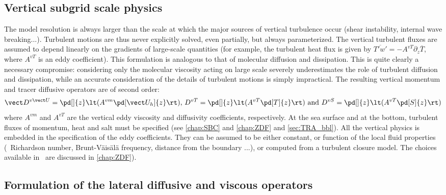 \documentclass[../main/NEMO_manual]{subfiles}
\begin{document}
\subsection{Vertical subgrid scale physics}
\label{subsec:MB_zdf}

The model resolution is always larger than the scale at which
the major sources of vertical turbulence occur (shear instability, internal wave breaking...).
Turbulent motions are thus never explicitly solved, even partially, but always parameterized.
The vertical turbulent fluxes are assumed to depend linearly on
the gradients of large-scale quantities (for example,
the turbulent heat flux is given by $\overline{T' w'} = -A^{v T} \partial_z \overline T$,
where $A^{v T}$ is an eddy coefficient).
This formulation is analogous to that of molecular diffusion and dissipation.
This is quite clearly a necessary compromise: considering only the molecular viscosity acting on
large scale severely underestimates the role of turbulent diffusion and dissipation,
while an accurate consideration of the details of turbulent motions is simply impractical.
The resulting vertical momentum and tracer diffusive operators are of second order:
\begin{equation}
  \label{eq:MB_zdf}
  \begin{gathered}
    \vect D^{v \vect U} = \pd[]{z} \lt( A^{vm} \pd[\vect U_h]{z} \rt) \text{,} \
          D^{vT}       = \pd[]{z} \lt( A^{vT} \pd[T]{z}         \rt) \ \text{and} \
          D^{vS}       = \pd[]{z} \lt( A^{vT} \pd[S]{z}         \rt)
  \end{gathered}
\end{equation}
where $A^{vm}$ and $A^{vT}$ are the vertical eddy viscosity and diffusivity coefficients,
respectively.
At the sea surface and at the bottom, turbulent fluxes of momentum, heat and salt must be specified
(see \autoref{chap:SBC} and \autoref{chap:ZDF} and \autoref{sec:TRA_bbl}).
All the vertical physics is embedded in the specification of the eddy coefficients.
They can be assumed to be either constant, or function of the local fluid properties
(\eg\ Richardson number, Brunt-V\"{a}is\"{a}l\"{a} frequency, distance from the boundary ...),
or computed from a turbulent closure model.
The choices available in \NEMO\ are discussed in \autoref{chap:ZDF}).

\subsection{Formulation of the lateral diffusive and viscous operators}
\label{subsec:MB_ldf}
\end{document}
